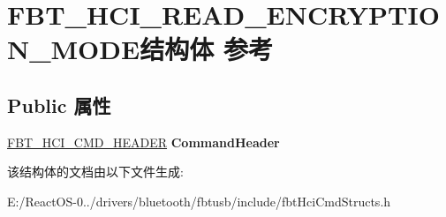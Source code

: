 \hypertarget{struct_f_b_t___h_c_i___r_e_a_d___e_n_c_r_y_p_t_i_o_n___m_o_d_e}{}\section{F\+B\+T\+\_\+\+H\+C\+I\+\_\+\+R\+E\+A\+D\+\_\+\+E\+N\+C\+R\+Y\+P\+T\+I\+O\+N\+\_\+\+M\+O\+D\+E结构体 参考}
\label{struct_f_b_t___h_c_i___r_e_a_d___e_n_c_r_y_p_t_i_o_n___m_o_d_e}
\subsection*{Public 属性}
\begin{DoxyCompactItemize}
\item 
\mbox{\label{struct_f_b_t___h_c_i___r_e_a_d___e_n_c_r_y_p_t_i_o_n___m_o_d_e_a53b2175f7dde615a523452bce8f544ef}} 
\hyperlink{struct_f_b_t___h_c_i___c_m_d___h_e_a_d_e_r}{F\+B\+T\+\_\+\+H\+C\+I\+\_\+\+C\+M\+D\+\_\+\+H\+E\+A\+D\+ER} {\bfseries Command\+Header}
\end{DoxyCompactItemize}


该结构体的文档由以下文件生成\+:\begin{DoxyCompactItemize}
\item 
E\+:/\+React\+O\+S-\/0../drivers/bluetooth/fbtusb/include/fbt\+Hci\+Cmd\+Structs.\+h\end{DoxyCompactItemize}
